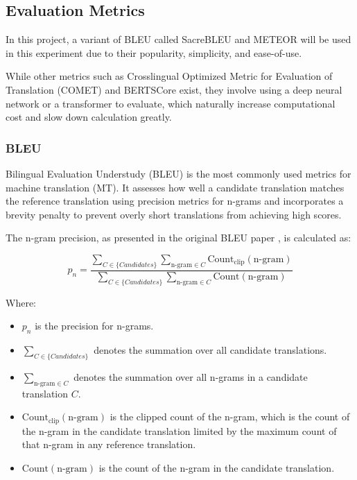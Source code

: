 \documentclass[a4paper]{article}
\begin{document}


\subsection{Evaluation Metrics}


In this project, a variant of BLEU \cite{papieni-2002-bleu} called SacreBLEU \cite{post-2018-sacrebleu} and METEOR \cite{lavie-2007-meteor} will be used in this experiment due to their popularity, simplicity, and ease-of-use.

While other metrics such as Crosslingual Optimized Metric for Evaluation of Translation (COMET) \cite{rei-2020-comet} and BERTSCore \cite{zhang-2020-bertscore} exist, they involve using a deep neural network or a transformer to evaluate, which naturally increase computational cost and slow down calculation greatly.

\subsubsection{BLEU}

Bilingual Evaluation Understudy (BLEU) \cite{papieni-2002-bleu} is the most commonly used metrics for machine translation (MT). It assesses how well a candidate translation matches the reference translation using precision metrics for n-grams and incorporates a brevity penalty to prevent overly short translations from achieving high scores.

The n-gram precision, as presented in the original BLEU paper \cite{papieni-2002-bleu}, is calculated as:

\begin{equation}
    p_n = \frac{\sum_{C \in \{Candidates\}} \sum_{\text{n-gram} \in C} \text{Count}_{\text{clip}}(\text{n-gram})}{\sum_{C \in \{Candidates\}} \sum_{\text{n-gram} \in C} \text{Count}(\text{n-gram})}
\end{equation}

Where:
\begin{itemize}
    \item \( p_n \) is the precision for n-grams.
    \item \( \sum_{C \in \{Candidates\}} \) denotes the summation over all candidate translations.
    \item \( \sum_{\text{n-gram} \in C} \) denotes the summation over all n-grams in a candidate translation \( C \).
    \item \( \text{Count}_{\text{clip}}(\text{n-gram}) \) is the clipped count of the n-gram, which is the count of the n-gram in the candidate translation limited by the maximum count of that n-gram in any reference translation.
    \item \( \text{Count}(\text{n-gram}) \) is the count of the n-gram in the candidate translation.
\end{itemize}
\end{document}
